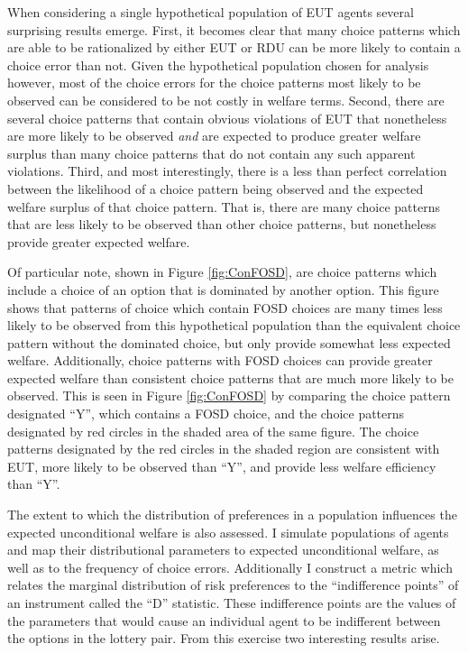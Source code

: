 \documentclass[../main.tex]{subfiles}
\begin{document}
When considering a single hypothetical population of EUT agents several surprising results emerge.
First, it becomes clear that many choice patterns which are able to be rationalized by either EUT or RDU can be more likely to contain a choice error than not.
Given the hypothetical population chosen for analysis however, most of the choice errors for the choice patterns most likely to be observed can be considered to be not costly in welfare terms.
Second, there are several choice patterns that contain obvious violations of EUT that nonetheless are more likely to be observed \textit{and} are expected to produce greater welfare surplus than many choice patterns that do not contain any such apparent violations.
Third, and most interestingly, there is a less than perfect correlation between the likelihood of a choice pattern being observed and the expected welfare surplus of that choice pattern.
That is, there are many choice patterns that are less likely to be observed than other choice patterns, but nonetheless provide greater expected welfare.

Of particular note, shown in Figure \ref{fig:ConFOSD}, are choice patterns which include a choice of an option that is dominated by another option.
This figure shows that patterns of choice which contain FOSD choices are many times less likely to be observed from this hypothetical population than the equivalent choice pattern without the dominated choice, but only provide somewhat less expected welfare.
Additionally, choice patterns with FOSD choices can provide greater expected welfare than consistent choice patterns that are much more likely to be observed.
This is seen in Figure \ref{fig:ConFOSD} by comparing the choice pattern designated \enquote{Y}, which contains a FOSD choice, and the choice patterns designated by red circles in the shaded area of the same figure.
The choice patterns designated by the red circles in the shaded region are consistent with EUT, more likely to be observed than \enquote{Y}, and provide less welfare efficiency than \enquote{Y}.

The extent to which the distribution of preferences in a population influences the expected unconditional welfare is also assessed.
I simulate populations of agents and map their distributional parameters to expected unconditional welfare, as well as to the frequency of choice errors.
Additionally I construct a metric which relates the marginal distribution of risk preferences to the \enquote{indifference points} of an instrument called the \enquote{D} statistic.
These indifference points are the values of the parameters that would cause an individual agent to be indifferent between the options in the lottery pair.
From this exercise two interesting results arise.
\end{document}
